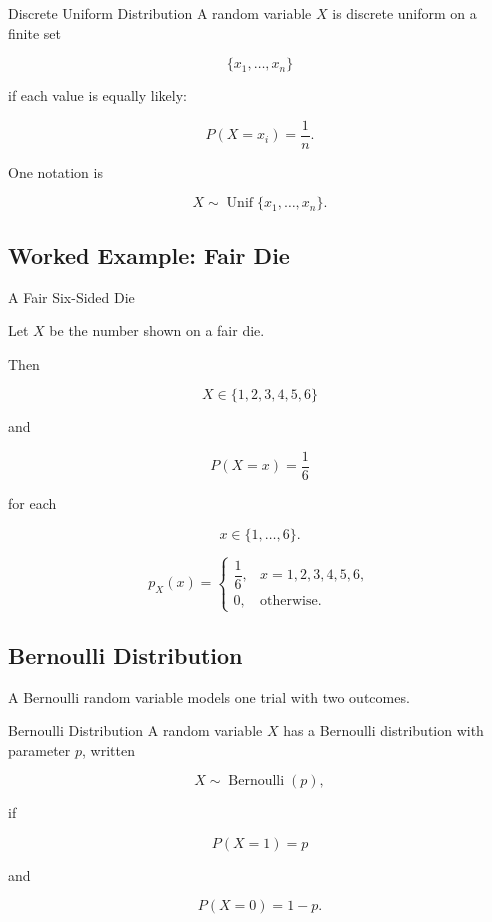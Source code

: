 \begin{definitionbox}{Discrete Uniform Distribution}
A random variable \(X\) is discrete uniform on a finite set

\[
\{x_1,\ldots,x_n\}
\]

if each value is equally likely:

\[
\boxed{
P(X=x_i)=\frac1n.
}
\]
\end{definitionbox}

One notation is

\[
X\sim\operatorname{Unif}\{x_1,\ldots,x_n\}.
\]

\subsection{Worked Example: Fair Die}
\label{subsec:worked-discrete-uniform-die}

\begin{workedexamplebox}{A Fair Six-Sided Die}

Let \(X\) be the number shown on a fair die.

Then

\[
X\in\{1,2,3,4,5,6\}
\]

and

\[
P(X=x)=\frac16
\]

for each

\[
x\in\{1,\ldots,6\}.
\]

\begin{answerbox}
\[
\boxed{
p_X(x)
=
\begin{cases}
\dfrac16,&x=1,2,3,4,5,6,\\[2mm]
0,&\text{otherwise}.
\end{cases}
}
\]
\end{answerbox}

\end{workedexamplebox}

\subsection{Bernoulli Distribution}
\label{subsec:bernoulli-distribution}

A Bernoulli random variable models one trial with two outcomes.

\begin{definitionbox}{Bernoulli Distribution}
A random variable \(X\) has a Bernoulli distribution with parameter
\(p\), written

\[
\boxed{
X\sim\operatorname{Bernoulli}(p),
}
\]

if

\[
\boxed{
P(X=1)=p
}
\]

and

\[
\boxed{
P(X=0)=1-p.
}
\]
\end{definitionbox}


